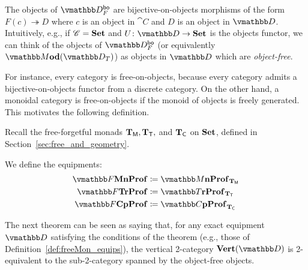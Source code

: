 \documentclass[11pt,oneside,article]{memoir}
\begin{document}
\begin{remark}
   The objects of $\dcat{D}_F^{\bo}$ are bijective-on-objects morphisms of the form
   $F(c)\twoheadrightarrow D$ where $c$ is an object in $\cat{C}$ and $D$ is an object in
   $\dcat{D}$. Intuitively, e.g., if $\mathscr{C}=\mathbf{Set}$ and $U\colon\dcat{D}\to\Set$ is the objects functor, we can think of the objects of $\dcat{D}_F^{\bo}$ (or equivalently
   $\dMod(\dcat{D}_T)$) as objects in $\dcat{D}$ which are \emph{object-free}.
   
   For instance, every category is free-on-objects, because every category admits a
   bijective-on-objects functor from a discrete category. On the other hand, a monoidal category is
   free-on-objects if the monoid of objects is freely generated. This motivates the following definition.
\end{remark}

Recall the free-forgetful monads $\mathbf{T}_{\mathsf{M}},\mathbf{T}_{\mathsf{T}},$ and $\mathbf{T}_{\mathsf{C}}$ on $\mathbf{Set}$, defined in Section~\ref{sec:free_and_geometry}. 

\begin{definition}\label{def:freeMon_equips}

We define the equipments:
\begin{align*}
   \dFrMonProf  &\coloneqq \dMonProf_{\TM}   \\
   \dFrTrProf   &\coloneqq \dTrProf_{\TT}     \\
   \dFrCompProf &\coloneqq \dCompProf_{\TC} 
\end{align*}
\end{definition}


The next theorem can be seen as saying that, for any exact equipment $\dcat{D}$ satisfying the
conditions of the theorem (e.g., those of Definition~\ref{def:freeMon_equips}), the vertical 2-category $\Ver(\dcat{D})$ is 2-equivalent to the sub-2-category spanned by the object-free objects.
\end{document}
